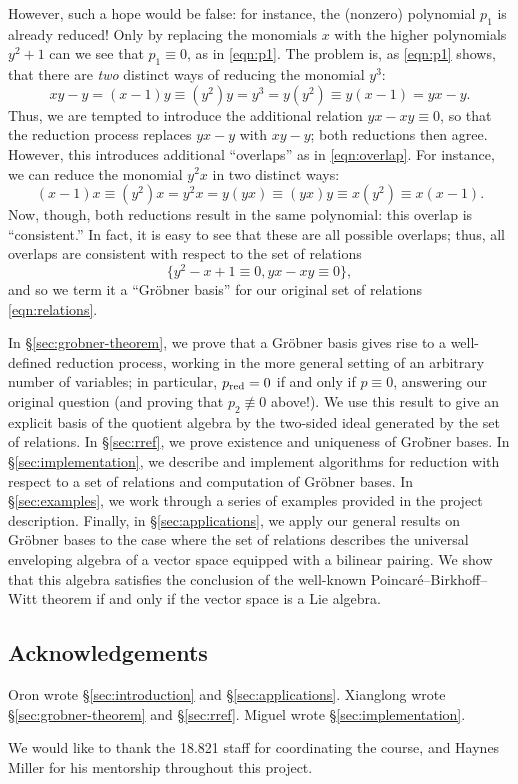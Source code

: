 However, such a hope would be false: for instance, the (nonzero) polynomial $p_1$ is already reduced! Only by replacing the monomials $x$ with the higher polynomials $y^2+1$ can we see that $p_1\equiv 0$, as in \eqref{eqn:p1}. The problem is, as \eqref{eqn:p1} shows, that there are \emph{two} distinct ways of reducing the monomial $y^3$:
\begin{equation}
\label{eqn:overlap}
xy-y=(x-1)y\equiv (y^2)y=y^3=y(y^2)\equiv y(x-1)=yx-y.
\end{equation}
Thus, we are tempted to introduce the additional relation $yx-xy\equiv 0$, so that the reduction process replaces $yx-y$ with $xy-y$; both reductions then agree. However, this introduces additional ``overlaps'' as in \eqref{eqn:overlap}. For instance, we can reduce the monomial $y^2x$ in two distinct ways:
\begin{equation*}
(x-1)x\equiv(y^2)x=y^2x=y(yx)\equiv(yx)y\equiv x(y^2)\equiv x(x-1).
\end{equation*}
Now, though, both reductions result in the same polynomial: this overlap is ``consistent.'' In fact, it is easy to see that these are all possible overlaps; thus, all overlaps are consistent with respect to the set of relations
\begin{equation*}
\{y^2-x+1\equiv 0, yx-xy\equiv 0\},
\end{equation*}
and so we term it a ``Gr\"obner basis'' for our original set of relations \eqref{eqn:relations}.

In \S\ref{sec:grobner-theorem}, we prove that a Gr\"obner basis gives rise to a well-defined reduction process, working in the more general setting of an arbitrary number of variables; in particular, $p_{\mathrm{red}}=0$ if and only if $p\equiv 0$, answering our original question (and proving that $p_2\not\equiv 0$ above!). We use this result to give an explicit basis of the quotient algebra by the two-sided ideal generated by the set of relations. In \S\ref{sec:rref}, we prove existence and uniqueness of Gro\"bner bases. In \S\ref{sec:implementation}, we describe and implement algorithms for reduction with respect to a set of relations and computation of Gr\"obner bases. In \S\ref{sec:examples}, we work through a series of examples provided in the project description. Finally, in \S\ref{sec:applications}, we apply our general results on Gr\"obner bases to the case where the set of relations describes the universal enveloping algebra of a vector space equipped with a bilinear pairing. We show that this algebra satisfies the conclusion of the well-known Poincar\'e--Birkhoff--Witt theorem if and only if the vector space is a Lie algebra.

\subsection*{Acknowledgements}

Oron wrote \S\ref{sec:introduction} and \S\ref{sec:applications}. Xianglong wrote \S\ref{sec:grobner-theorem} and \S\ref{sec:rref}. Miguel wrote \S\ref{sec:implementation}.

We would like to thank the 18.821 staff for coordinating the course, and Haynes Miller for his mentorship throughout this project.

